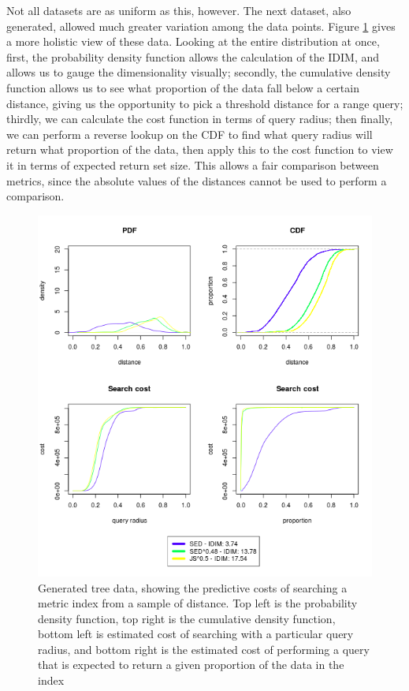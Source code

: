 Not all datasets are as uniform as this, however. The next dataset, also generated, allowed much greater variation among the data points.  Figure \ref{fig:random_trees_cost} gives a more holistic view of these data. Looking at the entire distribution at once, first, the probability density function allows the calculation of the IDIM, and allows us to gauge the dimensionality visually; secondly, the cumulative density function allows us to see what proportion of the data fall below a certain distance, giving us the opportunity to pick a threshold distance for a range query; thirdly, we can calculate the cost function in terms of query radius; then finally, we can perform a reverse lookup on the CDF to find what query radius will return what proportion of the data, then apply this to the cost function to view it in terms of expected return set size.  This allows a fair comparison between metrics, since the absolute values of the distances cannot be used to perform a comparison.


\begin{figure}[h!]
\centering
\includegraphics[width=0.9\columnwidth]{gfx/random_trees_cost}
\caption[Metric Search Cost -- Non-uniform Generated Trees]{Generated tree data, showing the predictive costs of searching a metric index from a sample of distance.  Top left is the probability density function, top right is the cumulative density function, bottom left is estimated cost of searching with a particular query radius, and bottom right is the estimated cost of performing a query that is expected to return a given proportion of the data in the index}
\label{fig:random_trees_cost}
\end{figure}

